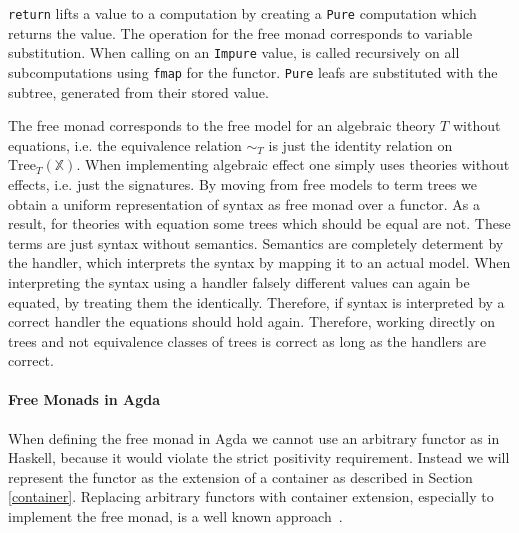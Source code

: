 \texttt{return} lifts a value to a computation by creating a
\texttt{Pure} computation which returns the value.
The \bind{} operation for the free monad corresponds to variable substitution.
When calling \bind{} on an \texttt{Impure} value, \bind{} is called
recursively on all subcomputations using \texttt{fmap} for the
functor.
\texttt{Pure} leafs are substituted with the subtree, generated
from their stored value.

The free monad corresponds to the free model for an algebraic theory $T$ without
equations, i.e. the equivalence relation $\sim_T$ is just the identity relation on
$\mathrm{Tree}_T(\mathbb{X})$.
When implementing algebraic effect one simply uses theories without effects,
i.e. just the signatures.
By moving from free models to term trees we obtain a uniform representation of
syntax as free monad over a functor.
As a result, for theories with equation some trees which should be equal are
not.
These terms are just syntax without semantics.
Semantics are completely determent by the handler, which interprets the syntax
by mapping it to an actual model.
When interpreting the syntax using a handler falsely different values can again
be equated, by treating them the identically.
Therefore, if syntax is interpreted by a correct handler the equations should
hold again.
Therefore, working directly on trees and not equivalence classes of trees is
correct as long as the handlers are correct.



\paragraph{Free Monads in Agda}
When defining the free monad in Agda we cannot use an arbitrary functor as in
Haskell, because it would violate the strict positivity requirement.
Instead we will represent the functor as the extension of a container as
described in Section \ref{container}.
Replacing arbitrary functors with container extension, especially to implement
the free monad, is a well known
approach~\cite{DBLP:journals/programming/DylusCT19,DBLP:conf/haskell/ChristiansenDB19,DBLP:conf/mpc/McBride15}.

